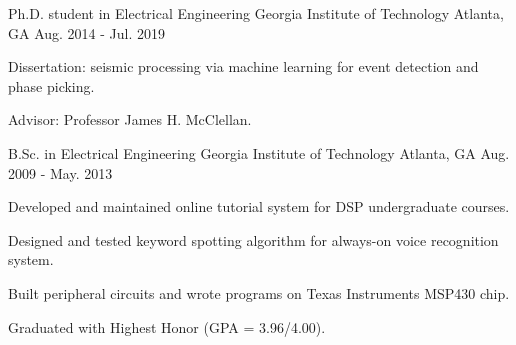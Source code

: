

\begin{cventries}

	\cventry
		{Ph.D. student in Electrical Engineering} %
		{Georgia Institute of Technology} %
		{Atlanta, GA} %
		{Aug. 2014 - Jul. 2019} %
		{
			\begin{cvitems} %
				\item {Dissertation: seismic processing via machine learning for event detection and phase picking.}
				\item {Advisor: Professor James H. McClellan.}
			\end{cvitems}
		}
		
	\cventry
		{B.Sc. in Electrical Engineering} %
		{Georgia Institute of Technology} %
		{Atlanta, GA} %
		{Aug. 2009 - May. 2013} %
		{
			\begin{cvitems} %
				\item {Developed and maintained online tutorial system for DSP undergraduate courses.}
				\item {Designed and tested keyword spotting algorithm for always-on voice recognition system.}
				\item {Built peripheral circuits and wrote programs on Texas Instruments MSP430 chip.}
				\item {Graduated with Highest Honor (GPA = 3.96/4.00).}
			\end{cvitems}
		}

\end{cventries}
